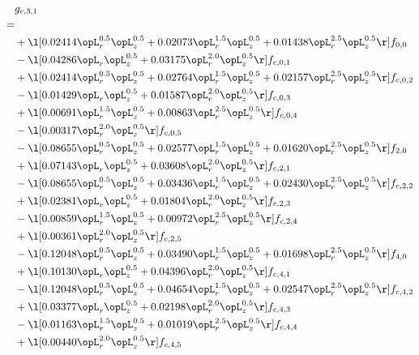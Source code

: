 \begin{alignat}{2} 
\label{eq:g_31_0} 
& g_{c,3,1} \nonumber \\ 
 = \\ 
& + \l[  0.02414 \opL_r^{0.5} \opL_z^{0.5} +  0.02073 \opL_r^{1.5} \opL_z^{0.5} +  0.01438 \opL_r^{2.5} \opL_z^{0.5}  \r] f_{0,0} \nonumber \\ 
& - \l[  0.04286 \opL_r \opL_z^{0.5} +  0.03175 \opL_r^{2.0} \opL_z^{0.5}  \r] f_{c,0,1} \nonumber \\ 
& + \l[  0.02414 \opL_r^{0.5} \opL_z^{0.5} +  0.02764 \opL_r^{1.5} \opL_z^{0.5} +  0.02157 \opL_r^{2.5} \opL_z^{0.5}  \r] f_{c,0,2} \nonumber \\ 
& - \l[  0.01429 \opL_r \opL_z^{0.5} +  0.01587 \opL_r^{2.0} \opL_z^{0.5}  \r] f_{c,0,3} \nonumber \\ 
& + \l[  0.00691 \opL_r^{1.5} \opL_z^{0.5} +  0.00863 \opL_r^{2.5} \opL_z^{0.5}  \r] f_{c,0,4} \nonumber \\ 
& - \l[  0.00317 \opL_r^{2.0} \opL_z^{0.5}  \r] f_{c,0,5} \nonumber \\ 
& - \l[  0.08655 \opL_r^{0.5} \opL_z^{0.5} +  0.02577 \opL_r^{1.5} \opL_z^{0.5} +  0.01620 \opL_r^{2.5} \opL_z^{0.5}  \r] f_{2,0} \nonumber \\ 
& + \l[  0.07143 \opL_r \opL_z^{0.5} +  0.03608 \opL_r^{2.0} \opL_z^{0.5}  \r] f_{c,2,1} \nonumber \\ 
& - \l[  0.08655 \opL_r^{0.5} \opL_z^{0.5} +  0.03436 \opL_r^{1.5} \opL_z^{0.5} +  0.02430 \opL_r^{2.5} \opL_z^{0.5}  \r] f_{c,2,2} \nonumber \\ 
& + \l[  0.02381 \opL_r \opL_z^{0.5} +  0.01804 \opL_r^{2.0} \opL_z^{0.5}  \r] f_{c,2,3} \nonumber \\ 
& - \l[  0.00859 \opL_r^{1.5} \opL_z^{0.5} +  0.00972 \opL_r^{2.5} \opL_z^{0.5}  \r] f_{c,2,4} \nonumber \\ 
& + \l[  0.00361 \opL_r^{2.0} \opL_z^{0.5}  \r] f_{c,2,5} \nonumber \\ 
& - \l[  0.12048 \opL_r^{0.5} \opL_z^{0.5} +  0.03490 \opL_r^{1.5} \opL_z^{0.5} +  0.01698 \opL_r^{2.5} \opL_z^{0.5}  \r] f_{4,0} \nonumber \\ 
& + \l[  0.10130 \opL_r \opL_z^{0.5} +  0.04396 \opL_r^{2.0} \opL_z^{0.5}  \r] f_{c,4,1} \nonumber \\ 
& - \l[  0.12048 \opL_r^{0.5} \opL_z^{0.5} +  0.04654 \opL_r^{1.5} \opL_z^{0.5} +  0.02547 \opL_r^{2.5} \opL_z^{0.5}  \r] f_{c,4,2} \nonumber \\ 
& + \l[  0.03377 \opL_r \opL_z^{0.5} +  0.02198 \opL_r^{2.0} \opL_z^{0.5}  \r] f_{c,4,3} \nonumber \\ 
& - \l[  0.01163 \opL_r^{1.5} \opL_z^{0.5} +  0.01019 \opL_r^{2.5} \opL_z^{0.5}  \r] f_{c,4,4} \nonumber \\ 
& + \l[  0.00440 \opL_r^{2.0} \opL_z^{0.5}  \r] f_{c,4,5} \nonumber \\ 
\end{alignat} 


